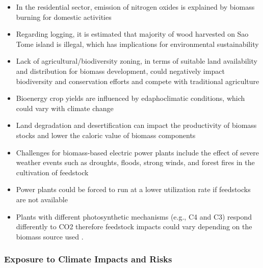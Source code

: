 \documentclass[
]{book}
\providecommand{\tightlist}{%
  \setlength{\itemsep}{0pt}\setlength{\parskip}{0pt}}
\begin{document}
\begin{itemize}
\tightlist
\item
  In the residential sector, emission of nitrogen oxides is explained by biomass burning for domestic activities
\item
  Regarding logging, it is estimated that majority of wood harvested on Sao Tome island is illegal, which has implications for environmental sustainability
\item
  Lack of agricultural/biodiversity zoning, in terms of suitable land availability and distribution for biomass development, could negatively impact biodiversity and conservation efforts and compete with traditional agriculture
\item
  Bioenergy crop yields are influenced by edaphoclimatic conditions, which could vary with climate change
\item
  Land degradation and desertification can impact the productivity of biomass stocks and lower the caloric value of biomass components
\item
  Challenges for biomass-based electric power plants include the effect of severe weather events such as droughts, floods, strong winds, and forest fires in the cultivation of feedstock
\item
  Power plants could be forced to run at a lower utilization rate if feedstocks are not available
\item
  Plants with different photosynthetic mechanisms (e.g., C4 and C3) respond differently to CO2 therefore feedstock impacts could vary depending on the biomass source used .
\end{itemize}

\hypertarget{exposure-to-climate-impacts-and-risks-4}{%
\subsubsection{Exposure to Climate Impacts and Risks}\label{exposure-to-climate-impacts-and-risks-4}}
\end{document}
